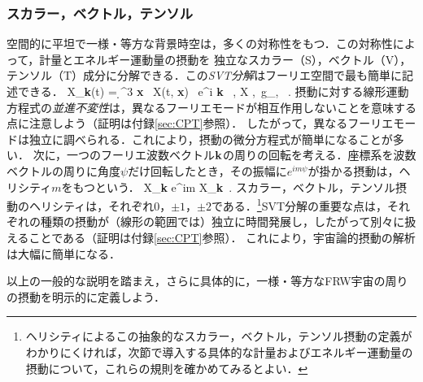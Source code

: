 \subsubsection{スカラー，ベクトル，テンソル}
空間的に平坦で一様・等方な背景時空は，多くの対称性をもつ．この対称性によって，計量とエネルギー運動量の摂動を
独立なスカラー（S），ベクトル（V），テンソル（T）成分に分解できる．この{\it SVT分解}はフーリエ空間で最も簡単に記述できる．
\beq
 X_{\bf k}(t) = \int \d^3 {\bf x} \  X(t, {\bf x}) \, e^{i {\bf k} }\, , \qquad X \equiv \delta \phi,\, \delta g_{\mu \nu}, \, .
\eeq 摂動に対する線形運動方程式の{\it 並進不変性}は，異なるフーリエモードが相互作用しないことを意味する点に注意しよう（証明は付録\ref{sec:CPT}参照）．
したがって，異なるフーリエモードは独立に調べられる．これにより，摂動の微分方程式が簡単になることが多い．
次に，一つのフーリエ波数ベクトル${\bf k}$の周りの回転を考える．座標系を波数ベクトルの周りに角度$\psi$だけ回転したとき，その振幅に$e^{i m \psi}$が掛かる摂動は，ヘリシティ$m$をもつという．
\beq X_{\bf k} \to e^{im \psi} X_{\bf k}\, .
\eeq スカラー，ベクトル，テンソル摂動のヘリシティは，それぞれ$0$，$\pm 1$，$\pm 2$である．\footnote{ヘリシティによるこの抽象的なスカラー，ベクトル，テンソル摂動の定義がわかりにくければ，次節で導入する具体的な計量およびエネルギー運動量の摂動について，これらの規則を確かめてみるとよい．}SVT分解の重要な点は，それぞれの種類の摂動が（線形の範囲では）独立に時間発展し，したがって別々に扱えることである（証明は付録\ref{sec:CPT}参照）．
これにより，宇宙論的摂動の解析は大幅に簡単になる．

\vskip 8pt
以上の一般的な説明を踏まえ，さらに具体的に，一様・等方なFRW宇宙の周りの摂動を明示的に定義しよう．



